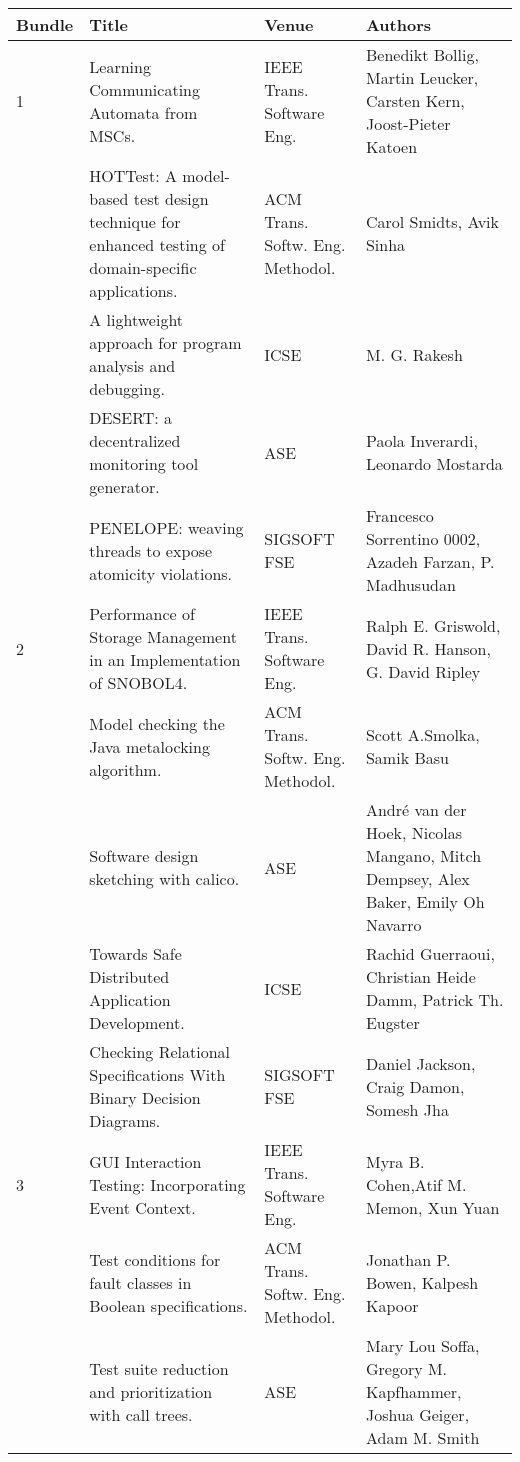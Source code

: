 \begin{center}
\begin{longtable}{|p{}p{}p{}p{}|}
    \hline
    Bundle & Title & Venue & Authors \\
    \hline
\rowcolor{black!20} 1 & Learning Communicating Automata from MSCs.& IEEE Trans. Software Eng.& 
Benedikt Bollig, Martin Leucker, Carsten Kern, Joost-Pieter Katoen \\
 & HOTTest: A model-based test design technique for enhanced testing of domain-specific 
applications.& ACM Trans. Softw. Eng. Methodol.& Carol Smidts, Avik Sinha \\
\rowcolor{black!20} & A lightweight approach for program analysis and debugging.& ICSE& M. G. Rakesh 
\\
 & DESERT: a decentralized monitoring tool generator.& ASE& Paola Inverardi, Leonardo Mostarda \\
\rowcolor{black!20} & PENELOPE: weaving threads to expose atomicity violations.& SIGSOFT FSE& 
Francesco Sorrentino 0002, Azadeh Farzan, P. Madhusudan \\
2 & Performance of Storage Management in an Implementation of SNOBOL4.& IEEE Trans. Software Eng.& 
Ralph E. Griswold, David R. Hanson, G. David Ripley \\
\rowcolor{black!20} & Model checking the Java metalocking algorithm.& ACM Trans. Softw. Eng. 
Methodol.& Scott A.Smolka, Samik Basu \\
 & Software design sketching with calico.& ASE& André van der Hoek, Nicolas Mangano, Mitch Dempsey, 
Alex Baker, Emily Oh Navarro \\
\rowcolor{black!20} & Towards Safe Distributed Application Development.& ICSE& Rachid Guerraoui, 
Christian Heide Damm, Patrick Th. Eugster \\
 & Checking Relational Specifications With Binary Decision Diagrams.& SIGSOFT FSE& Daniel Jackson, 
Craig Damon, Somesh Jha \\
\rowcolor{black!20} 3 & GUI Interaction Testing: Incorporating Event Context.& IEEE Trans. Software 
Eng.& Myra B. Cohen,Atif M. Memon, Xun Yuan \\
 & Test conditions for fault classes in Boolean specifications.& ACM Trans. Softw. Eng. Methodol.& 
Jonathan P. Bowen, Kalpesh Kapoor \\
\rowcolor{black!20} & Test suite reduction and prioritization with call trees.& ASE& Mary Lou Soffa, 
Gregory M. Kapfhammer, Joshua Geiger, Adam M. Smith \\

\end{longtable}
\end{center}
